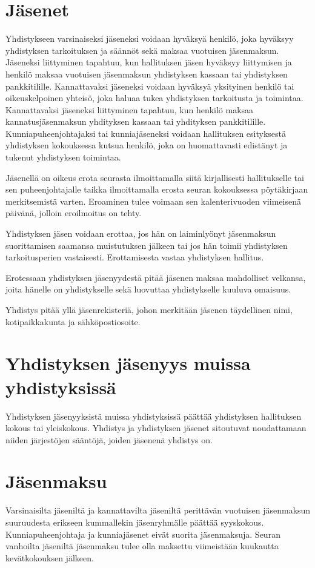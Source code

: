 \documentclass[a4paper, 12pt, finnish]{scrartcl}
\begin{document}
\section{Jäsenet}
Yhdistykseen varsinaiseksi jäseneksi voidaan hyväksyä henkilö, joka hyväksyy yhdistyksen tarkoituksen ja säännöt sekä maksaa vuotuisen jäsenmaksun.
Jäseneksi liittyminen tapahtuu, kun hallituksen jäsen hyväksyy liittymisen ja henkilö maksaa vuotuisen jäsenmaksun yhdistyksen kassaan tai yhdistyksen pankkitilille.
Kannattavaksi jäseneksi voidaan hyväksyä yksityinen henkilö tai oikeuskelpoinen yhteisö, joka haluaa tukea yhdistyksen tarkoitusta ja toimintaa.
Kannattavaksi jäseneksi liittyminen tapahtuu, kun henkilö maksaa kannatusjäsenmaksun yhdityksen kassaan tai yhdityksen pankkitilille.
Kunniapuheenjohtajaksi tai kunniajäseneksi voidaan hallituksen esityksestä yhdistyksen kokouksessa kutsua henkilö, joka on huomattavasti edistänyt ja tukenut yhdistyksen toimintaa.

Jäsenellä on oikeus erota seurasta ilmoittamalla siitä kirjallisesti hallitukselle tai sen puheenjohtajalle taikka ilmoittamalla erosta seuran kokouksessa pöytäkirjaan merkitsemistä varten. Eroaminen tulee voimaan sen kalenterivuoden viimeisenä päivänä, jolloin eroilmoitus on tehty.

Yhdistyksen jäsen voidaan erottaa, jos hän on laiminlyönyt jäsenmaksun suorittamisen saamansa muistutuksen jälkeen tai jos hän toimii yhdistyksen tarkoitusperien vastaisesti.
Erottamisesta vastaa yhdistyksen hallitus.

Erotessaan yhdistyksen jäsenyydestä pitää jäsenen maksaa mahdolliset velkansa, joita hänelle on yhdistykselle sekä luovuttaa yhdistykselle kuuluva omaisuus.

Yhdistys pitää yllä jäsenrekisteriä, johon merkitään jäsenen täydellinen nimi, kotipaikkakunta ja sähköpostiosoite.

\section{Yhdistyksen jäsenyys muissa yhdistyksissä}
Yhdistyksen jäsenyyksistä muissa yhdistyksissä päättää yhdistyksen hallituksen kokous tai yleiskokous.
Yhdistys ja yhdistyksen jäsenet sitoutuvat noudattamaan niiden järjestöjen sääntöjä, joiden jäsenenä yhdistys on.

\section{Jäsenmaksu}
Varsinaisilta jäseniltä ja kannattavilta jäseniltä perittävän vuotuisen jäsenmaksun suuruudesta erikseen kummallekin jäsenryhmälle päättää syyskokous.
Kunniapuheenjohtaja ja kunniajäsenet eivät suorita jäsenmaksuja.
Seuran vanhoilta jäseniltä jäsenmaksu tulee olla maksettu viimeistään kuukautta kevätkokouksen jälkeen.
\end{document}
